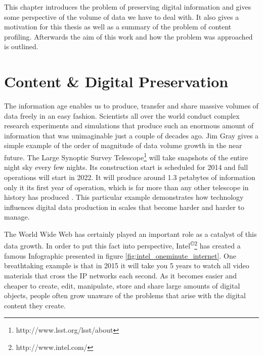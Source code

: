 This chapter introduces the problem of preserving digital information and gives some perspective of the volume of data we have to deal with. It also gives a motivation for this thesis as well as a summary of the problem of content profiling. Afterwards the aim of this work and how the problem was approached is outlined.

\section{Content \& Digital Preservation}
\label{ch:content_and_digital_preservation}
The information age enables us to produce, transfer and share massive volumes of data freely in an easy fashion. Scientists all over the world conduct complex research experiments and simulations that produce such an enormous amount of information that was unimaginable just a couple of decades ago. Jim Gray gives a simple example of the order of magnitude of data volume growth in the near future. The Large Synoptic Survey Telescope\footnote{http://www.lsst.org/lsst/about} will take snapshots of the entire night sky every few nights. Its construction start is scheduled for 2014 and full operations will start in 2022. It will produce around 1.3 petabytes of information only it its first year of operation, which is far more than any other telescope in history has produced \cite{Gray:2009:fourthparadigm}. This particular example demonstrates how technology influences digital data production in scales that become harder and harder to manage.

The World Wide Web has certainly played an important role as a catalyst of this data growth. In order to put this fact into perspective, Intel\textsuperscript{\copyright}\footnote{http://www.intel.com/} has created a famous Infographic presented in figure \ref{fig:intel_oneminute_internet}. One breathtaking example is that in 2015 it will take you 5 years to watch all video materials that cross the IP networks each second.
As it becomes easier and cheaper to create, edit, manipulate, store and share large amounts of digital objects, people often grow unaware of the problems that arise with the digital content they create.

